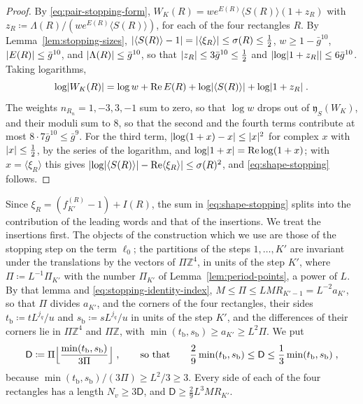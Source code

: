\documentclass[11pt]{preprint}
\DeclarePairedDelimiter{\abs}{\lvert}{\rvert}
\numberwithin{equation}{section}
\theoremstyle{definition}
\theoremstyle{remark}
\theoremstyle{plain}
\begin{document}
\begin{proof}
By \eqref{eq:pair-stopping-form}, $W_K(R) = we^{E(R)}\langle S(R)\rangle(1 + z_R)$ with $z_R \coloneqq \Lambda(R)/(we^{E(R)}\langle S(R)\rangle)$, for each of the four rectangles $R$. By Lemma~\ref{lem:stopping-sizes}, $\abs{\langle S(R)\rangle - 1} = \abs{\langle\xi_R\rangle} \leq \sigma(R) \leq \frac12$, $w \geq 1 - \bar g^{10}$, $\abs{E(R)} \leq \bar g^{10}$, and $\abs{\Lambda(R)} \leq \bar g^{10}$, so that $\abs{z_R} \leq 3\bar g^{10} \leq \frac12$ and $\abs{\log\abs{1 + z_R}} \leq 6\bar g^{10}$. Taking logarithms,
\begin{equation}\label{eq:shape-logarithms}
    \log\abs{W_K(R)} = \log w + \operatorname{Re}E(R) + \log\abs{\langle S(R)\rangle} + \log\abs{1 + z_R}\;.
\end{equation}
The weights $n_{R_n} = 1, -3, 3, -1$ sum to zero, so that $\log w$ drops out of $\mathfrak y_S(W_K)$, and their moduli sum to $8$, so that the second and the fourth terms contribute at most $8 \cdot 7\bar g^{10} \leq \bar g^9$. For the third term, $\abs{\log(1 + x) - x} \leq \abs{x}^2$ for complex $x$ with $\abs{x} \leq \frac12$, by the series of the logarithm, and $\log\abs{1 + x} = \operatorname{Re}\log(1 + x)$; with $x = \langle\xi_R\rangle$ this gives $\abs{\log\abs{\langle S(R)\rangle} - \operatorname{Re}\langle\xi_R\rangle} \leq \sigma(R)^2$, and \eqref{eq:shape-stopping} follows.
\end{proof}

Since $\xi_R = (f^{(R)}_{K'} - 1) + I(R)$, the sum in \eqref{eq:shape-stopping} splits into the contribution of the leading words and that of the insertions. We treat the insertions first. The objects of the construction which we use are those of the stopping step on the term $\ell_0$; the partitions of the steps $1, \dots, K'$ are invariant under the translations by the vectors of $\Pi\mathbb Z^4$, in units of the step $K'$, where $\Pi \coloneqq L^{-1}\Pi_{K'}$ with the number $\Pi_{K'}$ of Lemma~\ref{lem:period-points}, a power of $L$. By that lemma and \eqref{eq:stopping-identity-index}, $M \leq \Pi \leq LMR_{K'-1} = L^{-2}a_{K'}$, so that $\Pi$ divides $a_{K'}$, and the corners of the four rectangles, their sides $t_{\mathrm b} \coloneqq tL^{j_q}/u$ and $s_{\mathrm b} \coloneqq sL^{j_q}/u$ in units of the step $K'$, and the differences of their corners lie in $\Pi\mathbb Z^4$ and $\Pi\mathbb Z$, with $\min(t_{\mathrm b}, s_{\mathrm b}) \geq a_{K'} \geq L^2\Pi$. We put
\begin{equation}\label{eq:locality-length}
    \mathsf D \coloneqq \Pi\Bigl\lfloor\frac{\min(t_{\mathrm b}, s_{\mathrm b})}{3\Pi}\Bigr\rfloor\;,
    \qquad\text{so that}\qquad
    \frac29\min(t_{\mathrm b}, s_{\mathrm b}) \leq \mathsf D \leq \frac13\min(t_{\mathrm b}, s_{\mathrm b})\;,
\end{equation}
because $\min(t_{\mathrm b}, s_{\mathrm b})/(3\Pi) \geq L^2/3 \geq 3$. Every side of each of the four rectangles has a length $N_v \geq 3\mathsf D$, and $\mathsf D \geq \frac29L^3MR_{K'}$.
\end{document}
